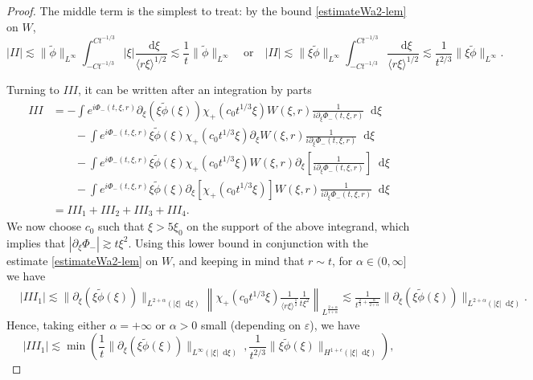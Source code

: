\documentclass[11 pt]{amsart}
\theoremstyle{definition}
\theoremstyle{remark}
\numberwithin{equation}{section}
\newcommand{\dd}{\mathop{}\!\mathrm{d}}
\begin{document}
\begin{proof}
The middle term is the simplest to treat: by the bound \eqref{estimateWa2-lem} on $W$,
$$
|II| \lesssim \| \widetilde{\phi} \|_{L^\infty} \int_{-C t^{-1/3}}^{C t^{-1/3}} |\xi| \frac{\dd \xi}{\langle r \xi \rangle^{1/2}} \lesssim \frac 1t \| \widetilde{\phi} \|_{L^\infty} \quad \mbox{or} \quad |II| \lesssim \| \xi \widetilde{\phi} \|_{L^\infty} \int_{-C t^{-1/3}}^{C t^{-1/3}} \frac{\dd \xi}{\langle r \xi \rangle^{1/2}} \lesssim \frac{1}{t^{2/3}} \| \xi \widetilde{\phi} \|_{L^\infty} .
$$

Turning to $III$, it can be written after an integration by parts
\begin{align*}
III & = - \int e^{i \Phi_-(t,\xi,r)} \partial_\xi (\xi \widetilde{\phi}(\xi))  \chi_+(c_0 t^{1/3} \xi) W(\xi,r) \frac{1}{i \partial_\xi \Phi_-(t,\xi,r)} \dd \xi \\
& \qquad -  \int e^{i \Phi_-(t,\xi,r)} \xi \widetilde{\phi}(\xi)  \chi_+(c_0 t^{1/3} \xi) \partial_\xi W(\xi,r)  \frac{1}{i \partial_\xi \Phi_-(t,\xi,r)} \dd \xi \\
& \qquad -  \int e^{i \Phi_-(t,\xi,r)} \xi \widetilde{\phi}(\xi)  \chi_+(c_0 t^{1/3} \xi) W(\xi,r)  \partial_\xi \left[ \frac{1}{i \partial_\xi \Phi_-(t,\xi,r)} \right] \dd \xi \\
&\qquad - \int e^{i \Phi_-(t,\xi,r)} \xi \widetilde{\phi}(\xi)\partial_\xi [  \chi_+(c_0 t^{1/3} \xi)] W(\xi,r) \frac{1}{i \partial_\xi \Phi_-(t,\xi,r)} \dd \xi \\
& = III_1 + III_2 + III_3+III_4.
\end{align*}
We now choose $c_0$ such that $\xi > 5\xi_0$ on the support of the above integrand, which implies that $|\partial_\xi \Phi_-| \gtrsim t \xi^2$. Using this lower bound in conjunction with the estimate \eqref{estimateWa2-lem} on $W$, and keeping in mind that $r \sim t$, for $\alpha \in (0,\infty]$ we have
\begin{align*}
& |III_1| \lesssim  \|  \partial_\xi (\xi \widetilde{\phi}(\xi)) \|_{L^{2+\alpha}(|\xi|\dd \xi)} \left\| \chi_+\left(c_0t^{1/3}\xi \right) \frac{1}{\langle r \xi \rangle^{\frac 12}}\frac{1}{t\xi^2}\right\|_{L^{\frac{2+\alpha}{1+\alpha}}}\lesssim \frac{1}{t^{\frac{2}{3}+\frac{\alpha}{2+\alpha}}} \|  \partial_\xi (\xi \widetilde{\phi}(\xi)) \|_{L^{2+\alpha}(|\xi|\dd \xi)}.
\end{align*}
Hence, taking either $\alpha = +\infty$ or $\alpha >0$ small (depending on $\varepsilon$), we have
$$
 |III_1|\lesssim \min \left(\frac{1}{t} \|  \partial_\xi (\xi \widetilde{\phi}(\xi)) \|_{L^{\infty}(|\xi|\dd \xi)} \ , \frac{1}{t^{2/3}} \|  \xi \widetilde{\phi}(\xi) \|_{H^{1+\epsilon}(|\xi|\dd \xi)}\right),
$$
\end{proof}
\end{document}
